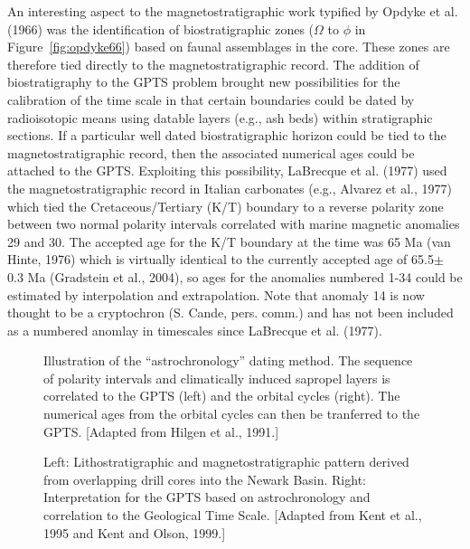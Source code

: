  An interesting aspect to the magnetostratigraphic work typified by Opdyke et al. (1966) was the identification of biostratigraphic zones ($\Omega$ to $\phi$ in Figure~\ref{fig:opdyke66})  based on faunal assemblages in the core. These zones are therefore tied directly to the magnetostratigraphic record.     The addition of biostratigraphy to the GPTS problem brought new possibilities for the calibration of the time scale in that certain boundaries could  be dated by radioisotopic means using datable layers (e.g., ash beds) within stratigraphic sections.  If a particular well dated biostratigraphic horizon could be tied to the magnetostratigraphic record, then the associated  numerical ages could be attached to the GPTS.     Exploiting this possibility, 
 LaBrecque et al. (1977) \nocite{labrecque77} used the magnetostratigraphic record  in Italian carbonates  (e.g., 
 Alvarez et al., 1977) \nocite{alvarez77}  which tied the Cretaceous/Tertiary (K/T) boundary to a reverse polarity zone between two normal polarity intervals correlated with marine magnetic anomalies 29 and 30.  The accepted age for the K/T boundary at the time was 65 Ma 
 (van Hinte, 1976) \nocite{vanhinte76} which is virtually identical to the currently accepted age of 65.5$\pm$ 0.3 Ma 
 (Gradstein et al., 2004), so ages for the anomalies numbered 1-34 could be estimated by interpolation and extrapolation.  Note that anomaly 14 is now thought to be a cryptochron (S. Cande, pers. comm.) and has not been included as a numbered anomlay in timescales since 
 LaBrecque et al. (1977).   






\nocite{shackleton90} \nocite{hilgen91} 

\begin{figure}[h!tb]
\epsfxsize 10cm
 \centering {}
 \caption{Illustration of the  ``astrochronology'' dating method.  The sequence of polarity intervals  and climatically induced sapropel layers is correlated to the GPTS (left) and the orbital cycles (right).  The numerical ages from the orbital cycles  can then be tranferred to the GPTS.  [Adapted from Hilgen et al., 1991.]}
 \label{fig:hilgen91}
 \end{figure} 
\clearpage
\begin{figure}[h!tb]
\epsfxsize 13cm
\centering {}
\caption{ Left: Lithostratigraphic and  magnetostratigraphic pattern derived from overlapping drill cores into the Newark Basin.  Right:  Interpretation for the GPTS based on astrochronology and correlation to the Geological Time Scale.  [Adapted from Kent et al., 1995 and Kent and Olson, 1999.]}
\label{fig:newark}
\end{figure}

